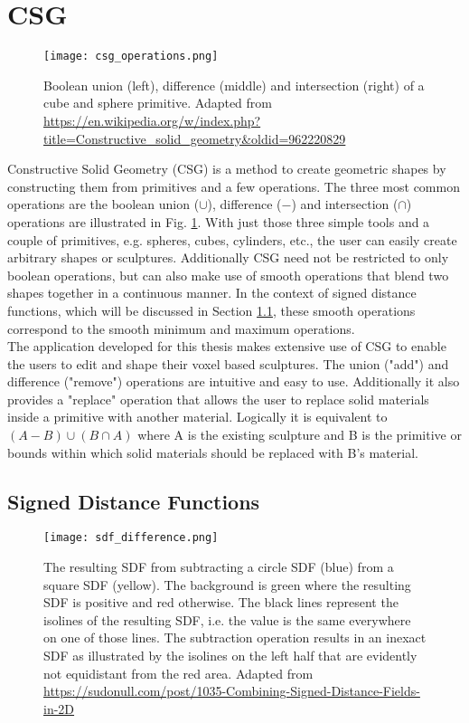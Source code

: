 \section{CSG}

\begin{figure}
\centering
\captionsetup{width=0.8\textwidth}
\texttt{[image: csg\_operations.png]}
\caption{Boolean union (left), difference (middle) and intersection (right) of a cube and sphere primitive. Adapted from \url{https://en.wikipedia.org/w/index.php?title=Constructive_solid_geometry&oldid=962220829}}
\label{fig:csg_operations}
\end{figure}

Constructive Solid Geometry (CSG) is a method to create geometric shapes by constructing them from primitives and a few operations.
The three most common operations are the boolean union ($\cup$), difference ($-$) and intersection ($\cap$) operations are illustrated in Fig. \ref{fig:csg_operations}. With just
those three simple tools and a couple of primitives, e.g. spheres, cubes, cylinders, etc., the user can easily create arbitrary shapes or sculptures.
Additionally CSG need not be restricted to only boolean operations, but can also make use of smooth operations that blend two shapes together in a continuous
manner. In the context of signed distance functions, which will be discussed in Section \ref{sec:signed_distance_functions}, these smooth operations correspond to the smooth minimum and maximum operations.\\
The application developed for this thesis makes extensive use of CSG to enable the users to edit and shape their voxel based sculptures. The union ("add") and
difference ("remove") operations are intuitive and easy to use. Additionally it also provides a "replace" operation that allows the user to replace solid materials inside
a primitive with another material. Logically it is equivalent to $(A-B) \cup (B \cap A)$ where A is the existing sculpture and B is the primitive or bounds within
which solid materials should be replaced with B's material.

\subsection{Signed Distance Functions}
\label{sec:signed_distance_functions}

\begin{figure}
\centering
\captionsetup{width=0.8\textwidth}
\texttt{[image: sdf\_difference.png]}
\caption{The resulting SDF from subtracting a circle SDF (blue) from a square SDF (yellow). The background is green where the resulting SDF is positive and red otherwise. The black lines represent the isolines of the resulting SDF, i.e. the value is the same everywhere on one of those lines. The subtraction operation results in an inexact SDF as illustrated by the isolines on the left half that are evidently not equidistant from the red area. Adapted from \url{https://sudonull.com/post/1035-Combining-Signed-Distance-Fields-in-2D}}
\label{fig:sdf_difference}
\end{figure}

